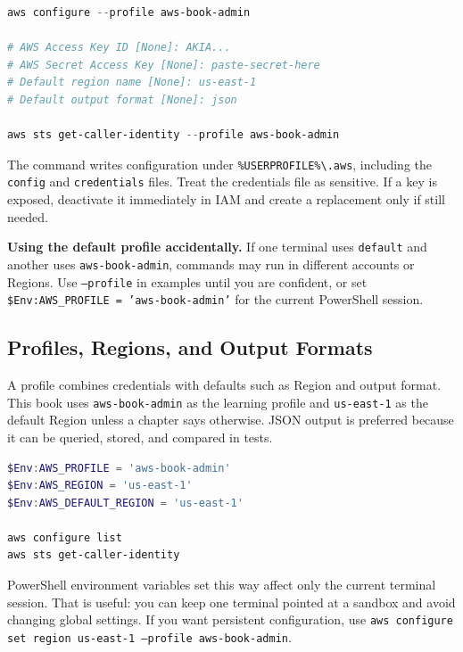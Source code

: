 \begin{lstlisting}[language=PowerShell,caption={Configuring an AWS CLI profile with access keys.},label={lst:aws-configure-keys}]
aws configure --profile aws-book-admin

# AWS Access Key ID [None]: AKIA...
# AWS Secret Access Key [None]: paste-secret-here
# Default region name [None]: us-east-1
# Default output format [None]: json

aws sts get-caller-identity --profile aws-book-admin
\end{lstlisting}

The command writes configuration under \texttt{\%USERPROFILE\%\textbackslash{}.aws}, including the \texttt{config} and \texttt{credentials} files. Treat the credentials file as sensitive. If a key is exposed, deactivate it immediately in IAM and create a replacement only if still needed.

\begin{pitfall}
\textbf{Using the default profile accidentally.} If one terminal uses \texttt{default} and another uses \texttt{aws-book-admin}, commands may run in different accounts or Regions. Use \texttt{--profile} in examples until you are confident, or set \texttt{\$Env:AWS\_PROFILE = 'aws-book-admin'} for the current PowerShell session.
\end{pitfall}

\subsection{Profiles, Regions, and Output Formats}
A profile combines credentials with defaults such as Region and output format. This book uses \texttt{aws-book-admin} as the learning profile and \texttt{us-east-1} as the default Region unless a chapter says otherwise. JSON output is preferred because it can be queried, stored, and compared in tests.

\begin{lstlisting}[language=PowerShell,caption={Selecting the book profile and Region for the current PowerShell session.},label={lst:aws-profile-region}]
$Env:AWS_PROFILE = 'aws-book-admin'
$Env:AWS_REGION = 'us-east-1'
$Env:AWS_DEFAULT_REGION = 'us-east-1'

aws configure list
aws sts get-caller-identity
\end{lstlisting}

PowerShell environment variables set this way affect only the current terminal session. That is useful: you can keep one terminal pointed at a sandbox and avoid changing global settings. If you want persistent configuration, use \texttt{aws configure set region us-east-1 --profile aws-book-admin}.

